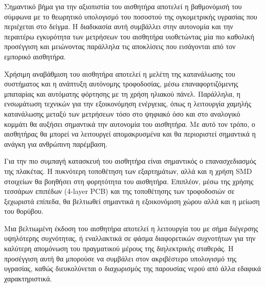 \par Σημαντικό βήμα για την αξιοπιστία του αισθητήρα αποτελεί η βαθμονόμισή του σύμφωνα με το θεωρητικό υπολογισμό του ποσοστού της ογκομετρικής υγρασίας που περιέχεται στο δείγμα. Η διαδικασία αυτή συμβάλλει στην αυτονομία και την περαιτέρω εγκυρότητα των μετρήσεων του αισθητήρα υιοθετώντας μία πιο καθολική προσέγγιση και μειώνοντας παράλληλα τις αποκλίσεις που εισάγονται από τον εμπορικό αισθητήρα.

\par Χρήσιμη αναβάθμιση του αισθητήρα αποτελεί η μελέτη της κατανάλωσης του συστήματος και η ανάπτυξη αυτόνομης τροφοδοσίας, μέσω επαναφορτιζόμενης μπαταρίας και αυτόματης φόρτησης με τη χρήση ηλιακού πάνελ. Παράλληλα, η ενσωμάτωση τεχνικών για την εξοικονόμηση ενέργειας, όπως η λειτουργία χαμηλής κατανάλωσης μεταξύ των μετρήσεων τόσο στο ψηφιακό όσο και στο αναλογικό κομμάτι θα αυξήσει σημαντικά την αυτονομία του αισθητήρα. Με αυτό τον τρόπο, ο αισθητήρας θα μπορεί να λειτουργεί απομακρυσμένα και θα  περιοριστεί σημαντικά η ανάγκη για ανθρώπινη παρέμβαση.

\par Για την πιο συμπαγή κατασκευή του αισθητήρα είναι σημαντικός ο επανασχεδιασμός της πλακέτας. Η πυκνότερη τοποθέτηση των εξαρτημάτων, αλλά και η χρήση SMD στοιχείων θα βοηθήσει στη φορητότητα του αισθητήρα. Επιπλέον, μέσω της χρήσης τεσσάρων επιπέδων (4-layer PCB) και της τοποθέτησης των τροφοδοσιών σε ξεχωριστά επίπεδα, θα βελτιωθεί σημαντικά η εξοικονόμιση χώρου αλλά και η μείωση του θορύβου.

\par Μια βελτιωμένη έκδοση του αισθητήρα αποτελεί η λειτουργία του με σήμα διέγερσης υψηλότερης συχνότητας, ή εναλλακτικά σε φάσμα διαφορετικών συχνοτήτων για την καλύτερη απομόνωση του πραγματικού μέρους της διηλεκτρικής σταθεράς. Η προσέγγιση αυτή θα μπορούσε να συμβάλει στον ακριβέστερο υπολογισμό της υγρασίας, καθώς διευκολύνεται ο διαχωρισμός της παρουσίας νερού από άλλα εδαφικά χαρακτηριστικά.
